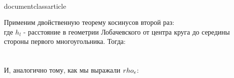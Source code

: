 \\documentclass{article}
\begin{document}
Применим двойственную теорему косинусов второй раз:
\\[cos(\\frac{\\pi}{Q}) = -cos(\\frac{\\pi}{P})cos(\\frac{\\pi}{2}) + sin(\\frac{\\pi}{P})sin(\\frac{\\pi}{2})ch(h_l),\\]
где $h_l$ - расстояние в геометрии Лобачевского от центра круга до середины стороны первого многоугольника. Тогда:
\\[cos(\\frac{\\pi}{Q}) = sin(\\frac{\\pi}{P})ch(h_l),\\]
\\[ch(h_l) = \\frac{cos(\\frac{\\pi}{Q})}{sin(\\frac{\\pi}{P})},\\]
\\[h_l = arch(\\frac{cos(\\frac{\\pi}{Q})}{sin(\\frac{\\pi}{P})})\\]
И, аналогично тому, как мы выражали $\\rho_e$:
\\[h_e = \\frac{1 - e^{-h_l}}{1 + e^{-h_l}},\\]
\\[h_e = \\frac{1 - e^{-arch(\\frac{cos(\\frac{\\pi}{Q})}{sin(\\frac{\\pi}{P})})}}{1 + e^{-arch(\\frac{cos(\\frac{\\pi}{Q})}{sin(\\frac{\\pi}{P})})}},\\]
\end{document}
